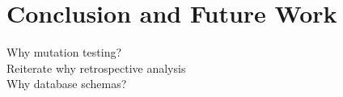 \section{Conclusion and Future Work}
Why mutation testing? \\
Reiterate why retrospective analysis \\
Why database schemas? \\

%
%



